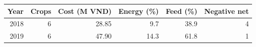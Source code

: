 \begin{tabular}{rrrrrr}
\toprule
Year & Crops & Cost (M VND) & Energy (\%) & Feed (\%) & Negative net \\
\midrule
2018 & 6 & 28.85 & 9.7 & 38.9 & 4 \\
2019 & 6 & 47.90 & 14.3 & 61.8 & 1 \\
\bottomrule
\end{tabular}